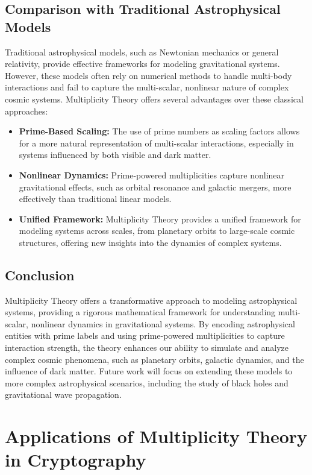 \documentclass[%
 preprint, linenumbers,
 amsmath,amssymb,
 aps, physrev,
]{revtex4-2}
\begin{document}
\subsection{Comparison with Traditional Astrophysical Models}
Traditional astrophysical models, such as Newtonian mechanics or general relativity, provide effective frameworks for modeling gravitational systems. However, these models often rely on numerical methods to handle multi-body interactions and fail to capture the multi-scalar, nonlinear nature of complex cosmic systems. Multiplicity Theory offers several advantages over these classical approaches:
\begin{itemize}
    \item \textbf{Prime-Based Scaling:} The use of prime numbers as scaling factors allows for a more natural representation of multi-scalar interactions, especially in systems influenced by both visible and dark matter.
    \item \textbf{Nonlinear Dynamics:} Prime-powered multiplicities capture nonlinear gravitational effects, such as orbital resonance and galactic mergers, more effectively than traditional linear models.
    \item \textbf{Unified Framework:} Multiplicity Theory provides a unified framework for modeling systems across scales, from planetary orbits to large-scale cosmic structures, offering new insights into the dynamics of complex systems.
\end{itemize}

\subsection{Conclusion}
Multiplicity Theory offers a transformative approach to modeling astrophysical systems, providing a rigorous mathematical framework for understanding multi-scalar, nonlinear dynamics in gravitational systems. By encoding astrophysical entities with prime labels and using prime-powered multiplicities to capture interaction strength, the theory enhances our ability to simulate and analyze complex cosmic phenomena, such as planetary orbits, galactic dynamics, and the influence of dark matter. Future work will focus on extending these models to more complex astrophysical scenarios, including the study of black holes and gravitational wave propagation.
\section{Applications of Multiplicity Theory in Cryptography}
\label{sec:Cryptography}
\end{document}
